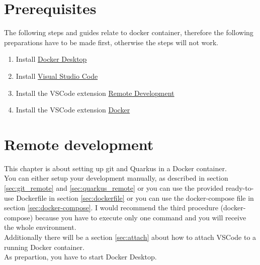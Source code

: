 
\chapter{Prerequisites}
    The following steps and guides relate to docker container, therefore the following preparations have to be made first, otherwise the steps will not work.  

    \begin{enumerate}
        \item Install \href{https://www.docker.com/products/docker-desktop/}{Docker Desktop}
        \item Install \href{https://code.visualstudio.com/download}{Visual Studio Code} 
        \item Install the VSCode extension \href{https://marketplace.visualstudio.com/items?itemName=ms-vscode-remote.vscode-remote-extensionpack}{Remote Development} 
        \item Install the VSCode extension \href{https://marketplace.visualstudio.com/items?itemName=ms-azuretools.vscode-docker}{Docker}
    \end{enumerate}    

\chapter{Remote development}
    This chapter is about setting up git and Quarkus in a Docker container. \\
    You can either setup your development manually, as described in section \ref{sec:git_remote} and \ref{sec:quarkus_remote} or you can use the provided ready-to-use Dockerfile in section \ref{sec:dockerfile} or you can use the docker-compose file in section \ref{sec:docker-compose}. I would recommend the third procedure (docker-compose) because you have to execute only one command and you will receive the whole environment. \\
    Additionally there will be a section \ref{sec:attach} about how to attach VSCode to a running Docker container. \\
    As prepartion, you have to start Docker Desktop. 

